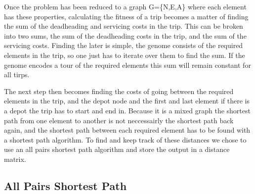 Once the problem has been reduced to a graph G=\{N,E,A\} where each element has these properties, calculating the fitness of a trip becomes a matter of finding the sum of the deadheading and servicing costs in the trip. This can be broken into two sums, the sum of the deadheading costs in the trip, and the sum of the servicing costs. Finding the later is simple, the genome consists of the required elements in the trip, so one just has to iterate over them to find the sum. If the genome encodes a tour of the required elements this sum will remain constant for all tirps.

The next step then becomes finding the costs of going between the required elements in the trip, and the depot node and the first and last element if there is a depot the trip has to start and end in. Because it is a mixed graph the shortest path from one element to another is not neccessairly the shortest path back again, and the shortest path between each required element has to be found with a shortest path algorithm. To find and keep track of these distances we chose to use an all pairs shortest path algorithm and store the output in a distance matrix.


\subsection{All Pairs Shortest Path} %
\label{sub:all_pairs_shortest_path}

